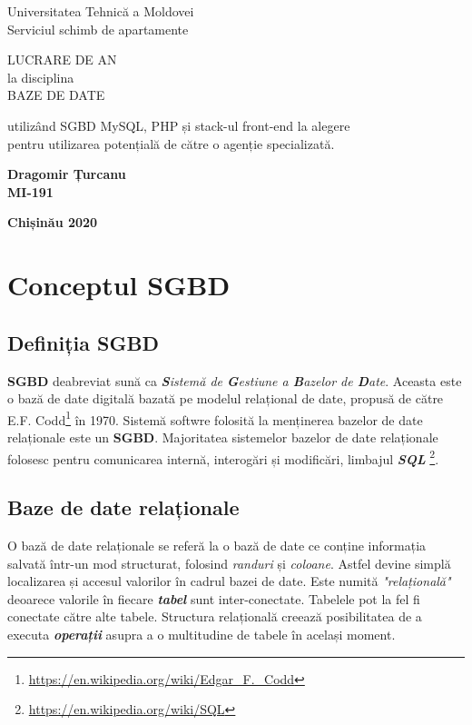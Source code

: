 \documentclass[12pt. a4paper]{report}
\begin{document}
\begin{titlepage}
\newlength{\drop}

\textheight
\vspace*{\drop}
\centering
{\LARGE Universitatea Tehnică a Moldovei}\\[2\baselineskip]
{\LARGE\sffamily Serviciul schimb de apartamente}\par
\vfill
{\LARGE LUCRARE DE AN\\
\small la disciplina \\
\large BAZE DE DATE}\par
\vspace{\drop}
{\large utilizând SGBD MySQL, PHP și stack-ul front-end la alegere \\
pentru utilizarea potențială de către o agenție specializată.}\par
\vfill
{\large\bfseries Dragomir Țurcanu\\
\small MI-191}\par
\vspace*{\drop}
{\large\bfseries Chișinău 2020}\par

\end{titlepage}



\tableofcontents

\chapter{Conceptul SGBD}

\section{Definiția SGBD}
\textbf{SGBD} deabreviat sună ca \emph{\textbf{S}istemă de \textbf{G}estiune a \textbf{B}azelor de \textbf{D}ate}. Aceasta este o bază de date digitală bazată pe modelul relațional de date, propusă de către E.F. Codd\footnote{\url{https://en.wikipedia.org/wiki/Edgar_F._Codd}} în 1970. Sistemă softwre folosită la menținerea bazelor de date relaționale este un \textbf{SGBD}. Majoritatea sistemelor bazelor de date relaționale folosesc pentru comunicarea internă, interogări și modificări, limbajul \emph{\textbf{SQL}} \footnote{\url{https://en.wikipedia.org/wiki/SQL}}.

\section{Baze de date relaționale}
O bază de date relaționale se referă la o bază de date ce conține informația salvată într-un mod structurat, folosind \emph{randuri} și \emph{coloane}. Astfel devine simplă localizarea și accesul valorilor în cadrul bazei de date. Este numită \emph{"relațională"} deoarece valorile în fiecare \emph{\textbf{tabel}} sunt inter-conectate. Tabelele pot la fel fi conectate către alte tabele. Structura relațională creează posibilitatea de a executa \emph{\textbf{operații}} asupra a o multitudine de tabele în același moment.
\end{document}
